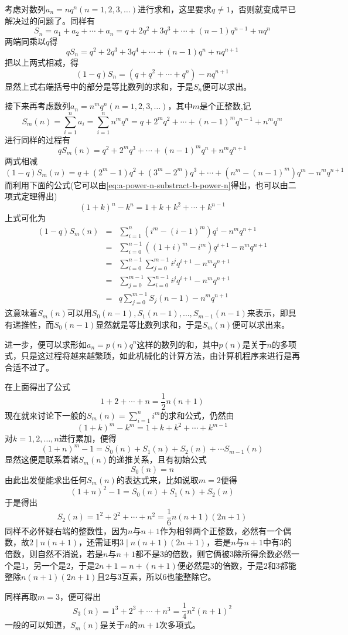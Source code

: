 \begin{example}[错位相减法的一个用途]
  考虑对数列$a_n = n q^n(n=1,2,3,\ldots)$进行求和，这里要求$q \neq 1$，否则就变成早已解决过的问题了。同样有
  \[ S_n = a_1+a_2+\cdots+a_n = q+2q^2+3q^3 + \cdots + (n-1)q^{n-1} + nq^n \]
  两端同乘以$q$得
  \[ qS_n = q^2+2q^3+3q^4 + \cdots + (n-1)q^n + nq^{n+1} \]
  把以上两式相减，得
  \[ (1-q)S_n = (q + q^2 + \cdots + q^n) - n q^{n+1} \]
  显然上式右端括号中的部分是等比数列的求和，于是$S_n$便可以求出。

  接下来再考虑数列$a_n=n^mq^n(n=1,2,3,\ldots)$，其中$m$是个正整数,记
  \[ S_m(n) = \sum_{i=1}^na_i = \sum_{i=1}^n n^m q^n = q + 2^mq^2 + \cdots + (n-1)^mq^{n-1} + n^m q^m \]
  进行同样的过程有
  \[ qS_m(n) = q^2 + 2^mq^3 + \cdots + (n-1)^m q^n + n^m q^{n+1} \]
  两式相减
  \[ (1-q)S_m(n) = q +(2^m-1)q^2 + (3^m-2^m)q^3 + \cdots + (n^m-(n-1)^m)q^m - n^mq^{n+1}  \]
  而利用下面的公式(它可以由\autoref{eq:a-power-n-substract-b-power-n}得出，也可以由二项式定理得出)
  \[ (1+k)^n-k^n = 1+k+k^2 + \cdots + k^{n-1} \]
  上式可化为
  \begin{eqnarray*}
    (1-q)S_m(n) & = & \sum_{i=1}^n(i^m-(i-1)^m)q^i - n^mq^{n+1} \\
                & = & \sum_{i=0}^{n-1}((1+i)^m-i^m)q^{i+1} - n^mq^{n+1} \\
                & = & \sum_{i=0}^{n-1}\sum_{j=0}^{m-1}i^jq^{i+1} - n^mq^{n+1} \\
                & = & \sum_{j=0}^{m-1}\sum_{i=0}^{n-1}i^jq^{i+1} - n^mq^{n+1} \\
    & = & q\sum_{j=0}^{m-1}S_j(n-1) - n^mq^{n+1}
  \end{eqnarray*}
  这意味着$S_m(n)$可以用$S_0(n-1),S_1(n-1),\ldots,S_{m-1}(n-1)$来表示，即具有递推性，而$S_0(n-1)$显然就是等比数列求和，于是$S_m(n)$便可以求出来。

  进一步，便可以求形如$a_n=p(n)q^n$这样的数列的和，其中$p(n)$是关于$n$的多项式，只是这过程将越来越繁琐，如此机械化的计算方法，由计算机程序来进行是再合适不过了。
\end{example}

\begin{example}[自然数的幂和]
  \label{example:sum-of-power-of-integer}
  在上面得出了公式
  \[ 1+2+\cdots+n = \frac{1}{2}n(n+1) \]
  现在就来讨论下一般的$S_m(n)=\sum_{i=1}^ni^m$的求和公式，仍然由
  \[ (1+k)^m-k^m = 1 + k + k^2 + \cdots + k^{m-1} \]
  对$k=1,2,\ldots,n$进行累加，便得
  \[ (1+n)^m-1 = S_0(n)+S_1(n)+S_2(n) + \cdots S_{m-1}(n) \]
  显然这便是联系着诸$S_m(n)$的递推关系，且有初始公式
  \[ S_0(n) = n \]
  由此出发便能求出任何$S_m(n)$的表达式来，比如说取$m=2$便得
  \[ (1+n)^2-1 = S_0(n)+S_1(n)+S_2(n) \]
  于是得出
  \[ S_2(n) = 1^2+2^2+\cdots+n^2 = \frac{1}{6}n(n+1)(2n+1) \]
  同样不必怀疑右端的整数性，因为$n$与$n+1$作为相邻两个正整数，必然有一个偶数，故$2 \mid n(n+1)$，还需证明$3 \mid n(n+1)(2n+1)$，若是$n$与$n+1$中有3的倍数，则自然不消说，若是$n$与$n+1$都不是3的倍数，则它俩被3除所得余数必然一个是1，另一个是2，于是$2n+1=n+(n+1)$便必然是3的倍数，于是2和3都能整除$n(n+1)(2n+1)$且2与3互素，所以6也能整除它。

  同样再取$m=3$，便可得出
  \[ S_3(n)= 1^3+2^3+\cdots+n^3 = \frac{1}{4}n^2(n+1)^2 \]
  一般的可以知道，$S_m(n)$是关于$n$的$m+1$次多项式。
\end{example}

